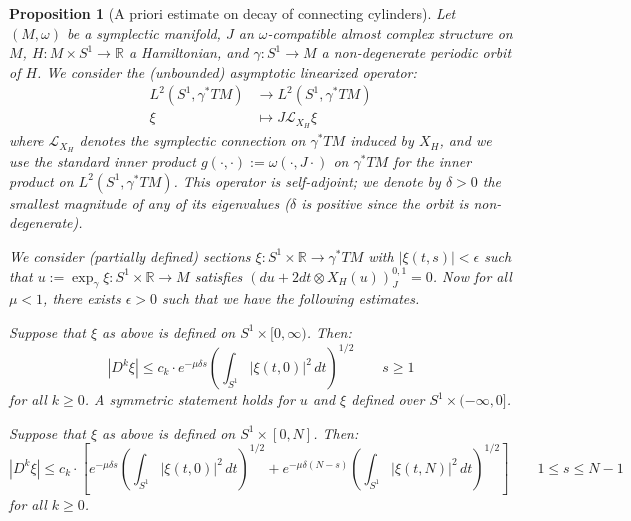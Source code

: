 \documentclass[12pt]{article}
\newtheorem{proposition}[theorem]{Proposition}
\theoremstyle{definition}
\theoremstyle{remark}
\numberwithin{equation}{subsection}
\newcommand{\RR}{\mathbb R}
\begin{document}
\begin{proposition}[A priori estimate on decay of connecting cylinders]\label{neckestimateHF}
Let $(M,\omega)$ be a symplectic manifold, $J$ an $\omega$-compatible almost complex structure on $M$, $H:M\times S^1\to\RR$ a Hamiltonian, and $\gamma:S^1\to M$ a non-degenerate periodic orbit of $H$.  We consider the (unbounded) asymptotic linearized operator:
\begin{align}
L^2(S^1,\gamma^\ast TM)&\to L^2(S^1,\gamma^\ast TM)\\
\xi&\mapsto J\mathcal L_{X_H}\xi
\end{align}
where $\mathcal L_{X_H}$ denotes the symplectic connection on $\gamma^\ast TM$ induced by $X_H$, and we use the standard inner product $g(\cdot,\cdot):=\omega(\cdot,J\cdot)$ on $\gamma^\ast TM$ for the inner product on $L^2(S^1,\gamma^\ast TM)$.  This operator is self-adjoint; we denote by $\delta>0$ the smallest magnitude of any of its eigenvalues ($\delta$ is positive since the orbit is non-degenerate).

We consider (partially defined) sections $\xi:S^1\times\RR\to\gamma^\ast TM$ with $\left|\xi(t,s)\right|<\epsilon$ such that $u:=\exp_\gamma\xi:S^1\times\RR\to M$ satisfies $(du+2dt\otimes X_H(u))^{0,1}_J=0$.  Now for all $\mu<1$, there exists $\epsilon>0$ such that we have the following estimates.

Suppose that $\xi$ as above is defined on $S^1\times[0,\infty)$.  Then:
\begin{equation}
\left|D^k\xi\right|\leq c_k\cdot e^{-\mu\delta s}\left(\int_{S^1}\bigl|\xi(t,0)\bigr|^2\,dt\right)^{1/2}\qquad s\geq 1
\end{equation}
for all $k\geq 0$.  A symmetric statement holds for $u$ and $\xi$ defined over $S^1\times(-\infty,0]$.

Suppose that $\xi$ as above is defined on $S^1\times[0,N]$.  Then:
\begin{equation*}
\left|D^k\xi\right|\leq c_k\cdot\left[e^{-\mu\delta s}\left(\int_{S^1}\bigl|\xi(t,0)\bigr|^2\,dt\right)^{1/2}+e^{-\mu\delta(N-s)}\left(\int_{S^1}\bigl|\xi(t,N)\bigr|^2\,dt\right)^{1/2}\right]\qquad 1\leq s\leq N-1
\end{equation*}
for all $k\geq 0$.
\end{proposition}
\end{document}
